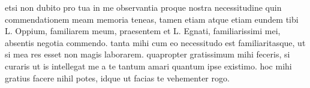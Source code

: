 


etsi non dubito pro tua in me observantia proque nostra necessitudine quin commendationem meam memoria teneas, tamen etiam atque etiam eundem tibi L. Oppium, familiarem
meum, praesentem et L. Egnati, familiarissimi mei, absentis negotia commendo. tanta mihi cum eo necessitudo est familiaritasque, ut si mea res esset non magis laborarem. quapropter gratissimum mihi feceris, si curaris ut is intellegat me a te tantum amari quantum ipse existimo. hoc mihi gratius facere nihil potes, idque ut facias te vehementer rogo.
